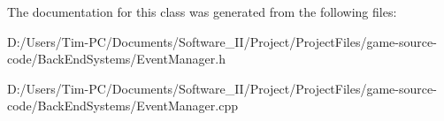 The documentation for this class was generated from the following files\+:\begin{DoxyCompactItemize}
\item 
D\+:/\+Users/\+Tim-\/\+P\+C/\+Documents/\+Software\+\_\+\+I\+I/\+Project/\+Project\+Files/game-\/source-\/code/\+Back\+End\+Systems/Event\+Manager.\+h\item 
D\+:/\+Users/\+Tim-\/\+P\+C/\+Documents/\+Software\+\_\+\+I\+I/\+Project/\+Project\+Files/game-\/source-\/code/\+Back\+End\+Systems/Event\+Manager.\+cpp\end{DoxyCompactItemize}
